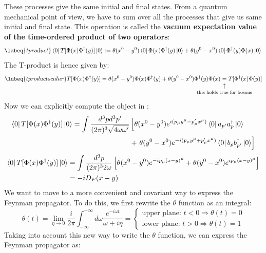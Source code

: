 \documentclass[../main.tex]{subfiles}
\begin{document}
These processes give the same initial and final states. From a quantum mechanical point of view, we have to sum over all the processes that give us same initial and final state. This operation is called the \textbf{vacuum expectation value of the time-ordered product of two operators}:
\begin{equation}
\labeq{tproduct}    
\bra{0}T[\Phi(x)\Phi^\dagger(y)]\ket{0}:=\theta(x^0-y^0)\bra{0}\Phi(x)\Phi^\dagger(y)\ket{0}+\theta(y^0-x^0)\bra{0}\Phi^\dagger(y)\Phi(x)\ket{0}\\
\end{equation}
The T-product is hence given by:
\begin{equation}
\labeq{tproductscalar}
T[\Phi(x)\Phi^\dagger(y)]=\theta(x^0-y^0)\Phi(x)\Phi^\dagger(y)+\theta(y^0-x^0)\Phi^\dagger(y)\Phi(x)\underset{\mathclap{\tikz \node {$\uparrow$} node [below=1ex] {\footnotesize this holds true for bosons };}}
=T[\Phi^\dagger(x)\Phi(y)]
\end{equation}
Now we can explicitly compute the object in :
\begin{align*}
\bra{0}T[\Phi(x)\Phi^\dagger(y)]\ket{0}=\int\frac{d^3pd^3p'}{(2\pi)^3\sqrt{4\omega\omega'}}&\left[\theta(x^0-y^0)e^{i(p_\mu y^\mu-p'_\mu x^\mu)}\bra{0}a_{p'}a^\dagger_p\ket{0}\right.\\
&+\left.\theta(y^0-x^0)e^{-i(p_\mu y^\mu+p'_\mu x^\mu)}\bra{0}b_pb^\dagger_{p'}\ket{0}\right]
\end{align*}
\begin{align*}
\bra{0}T[\Phi(x)\Phi^\dagger(y)]\ket{0}&=\int\frac{d^3p}{(2\pi)^32\omega}\left[\theta(x^0-y^0)e^{-ip_\mu(x-y)^\mu}+\theta(y^0-x^0)e^{ip_\mu(x-y)^\mu}\right]\\
&=-iD_F(x-y)
\end{align*}
We want to move to a more convenient and covariant way to express the Feynman propagator. To do this, we first rewrite the $\theta$ function as an integral:
\[
\theta(t)=\lim_{\eta\to0}\frac{i}{2\pi}\int_{-\infty}^{+\infty}d\omega\frac{e^{-i\omega t}}{\omega+i\eta}=\begin{cases}\text{upper plane: }t<0\Rightarrow\theta(t)=0\\ 
\text{lower plane: }t>0\Rightarrow\theta(t)=1
\end{cases}
\]
Taking into account this new way to write the $\theta$ function, we can express the Feynman propagator as:
\end{document}
